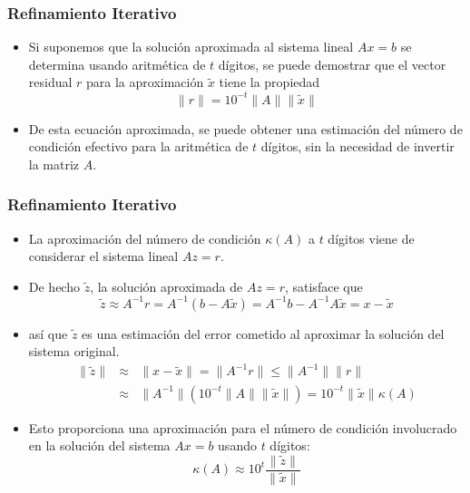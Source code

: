 \documentclass{beamer}
\begin{document}
  \begin{frame}
    \frametitle{Refinamiento Iterativo}
    \begin{itemize}
      \item Si suponemos que la soluci\'on aproximada al sistema lineal $A x = b$ se determina usando aritm\'etica de $t$ d\'igitos, se puede demostrar que el vector residual $r$ para la aproximaci\'on $\tilde x$ tiene la propiedad
      $$
       \|r\| = 10^{-t}\|A\|\|\tilde x\|
      $$
      \item<2-> De esta ecuaci\'on aproximada, se puede obtener una estimaci\'on del n\'umero de condici\'on efectivo para la aritm\'etica de $t$ d\'igitos, sin la necesidad de invertir la matriz $A$.
    \end{itemize}
  \end{frame}
  \begin{frame}
    \frametitle{Refinamiento Iterativo}
    \begin{itemize}
      \item La aproximaci\'on del n\'umero de condici\'on $\kappa(A)$ a $t$ d\'igitos viene de considerar el sistema lineal $A z = r$.
      \item<2-> De hecho $\tilde z$, la soluci\'on aproximada de $A z = r$, satisface que      
      $$
       \tilde z \approx A^{-1}r = A^{-1}(b-A\tilde x) = A^{-1}b - A^{-1}A\tilde x = x - \tilde x
      $$
      \item<3-> as\'i que $\tilde z$ es una estimaci\'on del error cometido al aproximar la soluci\'on del sistema original.      
      \begin{eqnarray}
       \nonumber \|\tilde z\| & \approx & \|x-\tilde x\|=\|A^{-1}r\| \leq \|A^{-1}\|\|r\|\\
       \nonumber & \approx & \|A^{-1}\|\left(10^{-t}\|A\|\|\tilde x\|\right) = 10^{-t}\|\tilde x\|\kappa(A)
      \end{eqnarray}
      \item<4-> Esto proporciona una aproximaci\'on para el n\'umero de condici\'on involucrado en la soluci\'on del sistema $A x = b$ usando $t$ d\'igitos:
      $$
       \kappa(A) \approx 10^t\frac{\|\tilde z\|}{\|\tilde x\|}
      $$      
    \end{itemize}
  \end{frame}      
\end{document}
